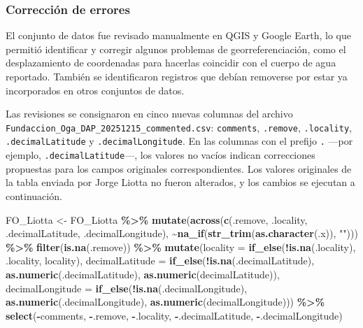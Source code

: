 \documentclass[sn-apa,pdflatex]{sn-jnl}
\newenvironment{Shaded}{\begin{snugshade}}{\end{snugshade}}
\newcommand{\AttributeTok}[1]{\textcolor[rgb]{0.13,0.29,0.53}{#1}}
\newcommand{\FunctionTok}[1]{\textcolor[rgb]{0.13,0.29,0.53}{\textbf{#1}}}
\newcommand{\NormalTok}[1]{#1}
\newcommand{\OtherTok}[1]{\textcolor[rgb]{0.56,0.35,0.01}{#1}}
\newcommand{\SpecialCharTok}[1]{\textcolor[rgb]{0.81,0.36,0.00}{\textbf{#1}}}
\newcommand{\StringTok}[1]{\textcolor[rgb]{0.31,0.60,0.02}{#1}}
\begin{document}
\subsubsection{Corrección de errores}\label{correcciuxf3n-de-errores-4}

El conjunto de datos fue revisado manualmente en QGIS y Google Earth, lo
que permitió identificar y corregir algunos problemas de
georreferenciación, como el desplazamiento de coordenadas para hacerlas
coincidir con el cuerpo de agua reportado. También se identificaron
registros que debían removerse por estar ya incorporados en otros
conjuntos de datos.

Las revisiones se consignaron en cinco nuevas columnas del archivo
\texttt{Fundaccion\_Oga\_DAP\_20251215\_commented.csv}:
\texttt{comments}, \texttt{.remove}, \texttt{.locality},
\texttt{.decimalLatitude} y \texttt{.decimalLongitude}. En las columnas
con el prefijo \texttt{.} ---por ejemplo, \texttt{.decimalLatitude}---,
los valores no vacíos indican correcciones propuestas para los campos
originales correspondientes. Los valores originales de la tabla enviada
por Jorge Liotta no fueron alterados, y los cambios se ejecutan a
continuación.

\begin{Shaded}
\begin{Highlighting}[]
\NormalTok{FO\_Liotta }\OtherTok{\textless{}{-}}\NormalTok{ FO\_Liotta }\SpecialCharTok{\%\textgreater{}\%}
    \FunctionTok{mutate}\NormalTok{(}\FunctionTok{across}\NormalTok{(}\FunctionTok{c}\NormalTok{(.remove, .locality, .decimalLatitude, .decimalLongitude),}
        \SpecialCharTok{\textasciitilde{}}\FunctionTok{na\_if}\NormalTok{(}\FunctionTok{str\_trim}\NormalTok{(}\FunctionTok{as.character}\NormalTok{(.x)), }\StringTok{""}\NormalTok{))) }\SpecialCharTok{\%\textgreater{}\%}
    \FunctionTok{filter}\NormalTok{(}\FunctionTok{is.na}\NormalTok{(.remove)) }\SpecialCharTok{\%\textgreater{}\%}
    \FunctionTok{mutate}\NormalTok{(}\AttributeTok{locality =} \FunctionTok{if\_else}\NormalTok{(}\SpecialCharTok{!}\FunctionTok{is.na}\NormalTok{(.locality), .locality, locality),}
        \AttributeTok{decimalLatitude =} \FunctionTok{if\_else}\NormalTok{(}\SpecialCharTok{!}\FunctionTok{is.na}\NormalTok{(.decimalLatitude), }\FunctionTok{as.numeric}\NormalTok{(.decimalLatitude),}
            \FunctionTok{as.numeric}\NormalTok{(decimalLatitude)), }\AttributeTok{decimalLongitude =} \FunctionTok{if\_else}\NormalTok{(}\SpecialCharTok{!}\FunctionTok{is.na}\NormalTok{(.decimalLongitude),}
            \FunctionTok{as.numeric}\NormalTok{(.decimalLongitude), }\FunctionTok{as.numeric}\NormalTok{(decimalLongitude))) }\SpecialCharTok{\%\textgreater{}\%}
    \FunctionTok{select}\NormalTok{(}\SpecialCharTok{{-}}\NormalTok{comments, }\SpecialCharTok{{-}}\NormalTok{.remove, }\SpecialCharTok{{-}}\NormalTok{.locality, }\SpecialCharTok{{-}}\NormalTok{.decimalLatitude,}
        \SpecialCharTok{{-}}\NormalTok{.decimalLongitude)}
\end{Highlighting}
\end{Shaded}
\end{document}

